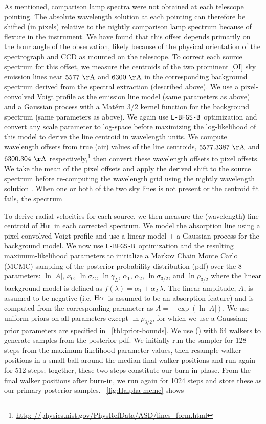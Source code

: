 \documentclass[modern, letterpaper]{aastex61}
\newcommand{\lbfgsb}{\texttt{L-BFGS-B}}
\newcommand{\Ha}{\ensuremath{{\rm H}\alpha}}
\begin{document}
As mentioned, comparison lamp spectra were not obtained at each telescope
pointing.
The absolute wavelength solution at each pointing can therefore be shifted
(in pixels) relative to the nightly comparison lamp spectrum because of flexure
in the instrument.
We have found that this offset depends primarily on the hour angle of the
observation, likely because of the physical orientation of the spectrograph and
CCD as mounted on the telescope.
To correct each source spectrum for this offset, we measure the centroids of
the two prominent [OI] sky emission lines near $5577~{\rm \AA}$ and $6300~{\rm
\AA}$ in the corresponding background spectrum derived from the spectral
extraction (described above).
We use a pixel-convolved Voigt profile as the emission line model (same
parameters as above) and a Gaussian process with a Mat\'ern 3/2 kernel function
for the background spectrum (same parameters as above).
We again use \lbfgsb\ optimization and convert any scale parameter to log-space
before maximizing the log-likelihood of this model to derive the line centroid
in wavelength units.
We compute wavelength offsets from true (air) values of the line centroids,
$5577.3387~{\rm \AA}$ and $6300.304~{\rm \AA}$ respectively,\footnote{\url{http:
//physics.nist.gov/PhysRefData/ASD/lines_form.html}} then convert these
wavelength offsets to pixel offsets.
We take the mean of the pixel offsets and apply the derived shift to the source
spectrum before re-computing the wavelength grid using the nightly wavelength
solution .
When one or both of the two sky lines is not present or the centroid fit fails,
the spectrum 

To derive radial velocities for each source, we then measure the (wavelength)
line centroid of \Ha\ in each corrected spectrum.
We model the absorption line using a pixel-convolved Voigt profile and use a
linear model + a Gaussian process for the background model.
We now use \lbfgsb\ optimization and the resulting maximum-likelihood parameters
to initialize a Markov Chain Monte Carlo (MCMC) sampling of the posterior
probability distribution (pdf) over the 8 parameters: $\ln |A|$, $x_0$,
$\ln\sigma_G$, $\ln\gamma_L$, $\alpha_1$, $\alpha_2$, $\ln\sigma_{3/2}$, and
$\ln\rho_{3/2}$ where the linear background model is defined as $f(\lambda) =
\alpha_1 + \alpha_2\,\lambda$.
The linear amplitude, $A$, is assumed to be negative (i.e. \Ha\ is assumed to be
an absorption feature) and is computed from the corresponding parameter as $A =
-\exp(\ln |A|)$.
We use uniform priors on all parameters except $\ln\rho_{3/2}$, for which we use
a Gaussian; prior parameters are specified in \tablename~\ref{tbl:prior-bounds}.
We use  (\citealt{Foreman-Mackey:2013}) with 64 walkers to
generate samples from the posterior pdf.
We initially run the sampler for 128 steps from the maximum likelihood parameter
values, then resample walker positions in a small ball around the median final
walker positions and run again for 512 steps; together, these two steps
constitute our burn-in phase.
From the final walker positions after burn-in, we run again for 1024 steps and
store these as our primary posterior samples.
\figurename~\ref{fig:Halpha-mcmc} shows
\end{document}
